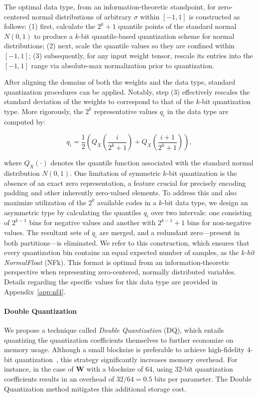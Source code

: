 The optimal data type, from an information-theoretic standpoint, for zero-centered normal distributions of arbitrary $\sigma$ within $[-1, 1]$ is constructed as follows: (1) first, calculate the $2^k+1$ quantile points of the standard normal $N(0, 1)$ to produce a $k$-bit quantile-based quantization scheme for normal distributions; (2) next, scale the quantile values so they are confined within $[-1, 1]$; (3) subsequently, for any input weight tensor, rescale its entries into the $[-1, 1]$ range via absolute-max normalization prior to quantization.

After aligning the domains of both the weights and the data type, standard quantization procedures can be applied. Notably, step (3) effectively rescales the standard deviation of the weights to correspond to that of the $k$-bit quantization type. More rigorously, the $2^k$ representative values $q_i$ in the data type are computed by:

\begin{equation}
q_i  = \frac{1}{2}\left( Q_X\left(\frac{i}{2^k+1}\right) + Q_X\left(\frac{i+1}{2^k+1}\right)\right),
\end{equation}

where $Q_X(\cdot)$ denotes the quantile function associated with the standard normal distribution $N(0,1)$. One limitation of symmetric $k$-bit quantization is the absence of an exact zero representation, a feature crucial for precisely encoding padding and other inherently zero-valued elements. To address this and also maximize utilization of the $2^k$ available codes in a $k$-bit data type, we design an asymmetric type by calculating the quantiles $q_i$ over two intervals: one consisting of $2^{k-1}$ bins for negative values and another with $2^{k-1}+1$ bins for non-negative values. The resultant sets of $q_i$ are merged, and a redundant zero—present in both partitions—is eliminated. We refer to this construction, which ensures that every quantization bin contains an equal expected number of samples, as the \emph{k-bit NormalFloat} (NFk). This format is optimal from an information-theoretic perspective when representing zero-centered, normally distributed variables. Details regarding the specific values for this data type are provided in Appendix~\ref{app:nf4}.

\paragraph{Double Quantization{}} 
We propose a technique called \emph{Double Quantization} (DQ), which entails quantizing the quantization coefficients themselves to further economize on memory usage. Although a small blocksize is preferable to achieve high-fidelity 4-bit quantization~\citep{dettmers2022case}, this strategy significantly increases memory overhead. For instance, in the case of $\mathbf{W}$ with a blocksize of 64, using 32-bit quantization coefficients results in an overhead of $32/64 = 0.5$ bits per parameter. The Double Quantization method mitigates this additional storage cost.

